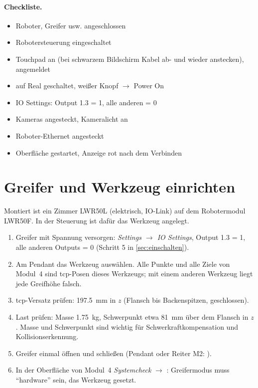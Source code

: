 \paragraph{Checkliste.}
\begin{itemize}
  \item[$\square$] Roboter, Greifer usw. angeschlossen
  \item[$\square$] Robotersteuerung eingeschaltet
  \item[$\square$] Touchpad an (bei schwarzem Bildschirm Kabel ab- und wieder anstecken), angemeldet
  \item[$\square$] auf Real geschaltet, weißer Knopf $\rightarrow$ Power On
  \item[$\square$] IO Settings: Output 1.3 = 1, alle anderen = 0
  \item[$\square$] Kameras angesteckt, Kameralicht an
  \item[$\square$] Roboter-Ethernet angesteckt
  \item[$\square$] Oberfläche gestartet, Anzeige rot nach dem Verbinden
\end{itemize}

\section{Greifer und Werkzeug einrichten}
\label{sec:greifer}

Montiert ist ein Zimmer LWR50L (elektrisch, IO-Link) auf dem Robotermodul LWR50F. In der
Steuerung ist dafür das Werkzeug  angelegt.

\begin{enumerate}
  \item Greifer mit Spannung versorgen: \emph{Settings $\rightarrow$ IO Settings},
    Output 1.3 = 1, alle anderen Outputs = 0 (Schritt 5 in \cref{sec:einschalten}).
  \item Am Pendant das Werkzeug  auswählen. Alle Punkte und alle Ziele von
    Modul~4 sind \acs{tcp}-Posen dieses Werkzeugs; mit einem anderen Werkzeug liegt jede
    Greifhöhe falsch.
  \item \acs{tcp}-Versatz prüfen: \SI{197.5}{\milli\metre} in $z$ (Flansch bis Backenspitzen,
    geschlossen).
  \item Last prüfen: Masse \SI{1.75}{\kilo\gram}, Schwerpunkt etwa \SI{81}{\milli\metre} über
    dem Flansch in $z$. Masse und Schwerpunkt sind wichtig für Schwerkraftkompensation und
    Kollisionserkennung.
  \item Greifer einmal öffnen und schließen (Pendant oder Reiter M2: ).
  \item In der Oberfläche von Modul~4 \emph{Systemcheck} $\rightarrow$
    : Greifermodus muss \enquote{hardware} sein, das
    Werkzeug gesetzt.
\end{enumerate}

